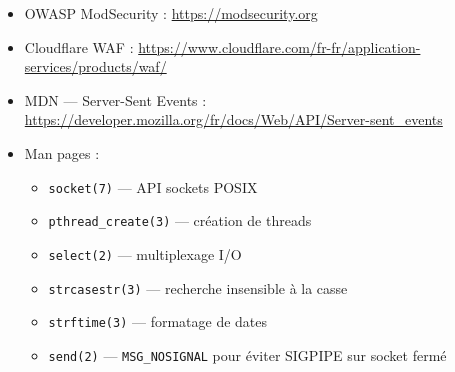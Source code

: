 \documentclass[12pt,a4paper]{article}
\begin{document}
\begin{itemize}
  \item OWASP ModSecurity : \url{https://modsecurity.org}
  \item Cloudflare WAF : \url{https://www.cloudflare.com/fr-fr/application-services/products/waf/}
  \item MDN --- Server-Sent Events : \url{https://developer.mozilla.org/fr/docs/Web/API/Server-sent_events}
  \item Man pages :
  \begin{itemize}
    \item \texttt{socket(7)} --- API sockets POSIX
    \item \texttt{pthread\_create(3)} --- création de threads
    \item \texttt{select(2)} --- multiplexage I/O
    \item \texttt{strcasestr(3)} --- recherche insensible à la casse
    \item \texttt{strftime(3)} --- formatage de dates
    \item \texttt{send(2)} --- \texttt{MSG\_NOSIGNAL} pour éviter SIGPIPE sur socket fermé
  \end{itemize}
\end{itemize}
\end{document}
